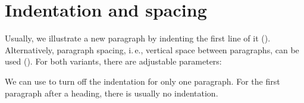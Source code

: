 
\section*{Indentation and spacing}
\label{sec:indents-and-parskips}
Usually, we illustrate a new paragraph by indenting the first line of it 
(). 
Alternatively, paragraph spacing, i.\,e., vertical space between paragraphs, 
can be used ().
For both variants, there are adjustable parameters:

\noindent We can use  to turn off the indentation for only one 
paragraph. 
For the first paragraph after a heading, there is usually no indentation. 


